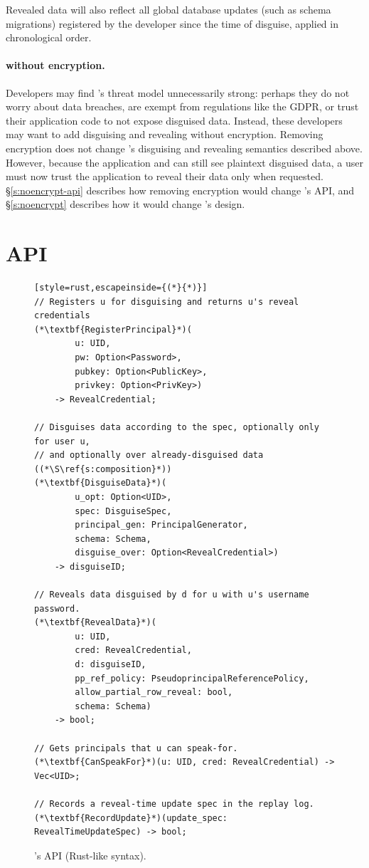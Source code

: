 Revealed data will also reflect all global database updates (such as schema
migrations) registered by the developer since the time of disguise, applied in
chronological order.


\paragraph{\sys without encryption.}
\label{s:semantics:noencrypt}

Developers may find \sys's threat model unnecessarily strong: perhaps they do
not worry about data breaches, are exempt from regulations like the GDPR, or
trust their application code to not expose disguised data. Instead, these
developers may want to add disguising and revealing without encryption.
%
Removing encryption does not change \sys's disguising and revealing semantics
described above.
However, because the application and \sys can still see plaintext disguised
data, a user must now trust the application to reveal their data only when 
requested. 
%
\S\ref{s:noencrypt-api} describes how removing encryption would change \sys's
API, and \S\ref{s:noencrypt} describes how it would change
\sys's design.


\section{API}
\label{s:api}

\begin{figure}[t]
\begin{lstlisting}[style=rust,escapeinside={(*}{*)}]
// Registers u for disguising and returns u's reveal credentials 
(*\textbf{RegisterPrincipal}*)(
        u: UID, 
        pw: Option<Password>,
        pubkey: Option<PublicKey>, 
        privkey: Option<PrivKey>)
    -> RevealCredential;

// Disguises data according to the spec, optionally only for user u, 
// and optionally over already-disguised data ((*\S\ref{s:composition}*))
(*\textbf{DisguiseData}*)(
        u_opt: Option<UID>, 
        spec: DisguiseSpec,
        principal_gen: PrincipalGenerator,
        schema: Schema,
        disguise_over: Option<RevealCredential>) 
    -> disguiseID;

// Reveals data disguised by d for u with u's username password. 
(*\textbf{RevealData}*)(
        u: UID, 
        cred: RevealCredential,
        d: disguiseID, 
        pp_ref_policy: PseudoprincipalReferencePolicy,
        allow_partial_row_reveal: bool,
        schema: Schema)
    -> bool;

// Gets principals that u can speak-for.
(*\textbf{CanSpeakFor}*)(u: UID, cred: RevealCredential) -> Vec<UID>;

// Records a reveal-time update spec in the replay log.
(*\textbf{RecordUpdate}*)(update_spec: RevealTimeUpdateSpec) -> bool;
\end{lstlisting}
\caption{\sys's API (Rust-like syntax).}
\label{f:api-high}
\end{figure}
%

